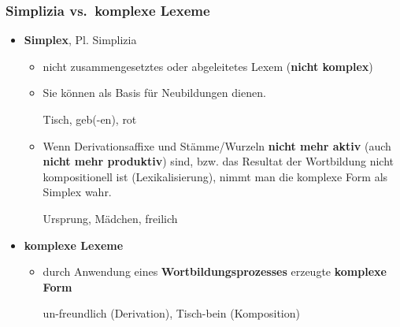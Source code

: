\begin{frame}
\frametitle{Simplizia vs.\ komplexe Lexeme}

\begin{itemize}
	\item \textbf{Simplex}, Pl. Simplizia \citep[vgl.][]{Eins16b}
	
	\begin{itemize}
		\item nicht zusammengesetztes oder abgeleitetes Lexem (\textbf{nicht komplex})
		\item Sie können als Basis für Neubildungen dienen.
		
		\ea Tisch, geb(-en), rot
		\z 
		
		\item Wenn Derivationsaffixe und Stämme/Wurzeln \textbf{nicht mehr aktiv} (auch \textbf{nicht mehr produktiv}) sind, bzw. das Resultat der Wortbildung nicht kompositionell ist (Lexikalisierung), nimmt man die komplexe Form als Simplex wahr.

		\ea Ursprung, Mädchen, freilich
		\z 
	\end{itemize}

\pause 

	\item \textbf{komplexe Lexeme}
	
	\begin{itemize}
		\item durch Anwendung eines \textbf{Wortbildungsprozesses} erzeugte \textbf{komplexe Form}
		
		\ea un-freundlich (Derivation), Tisch-bein (Komposition)
		\z 
	\end{itemize}
\end{itemize}

\end{frame}


